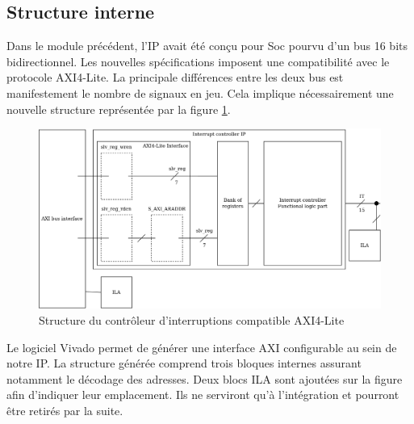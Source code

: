 \subsection{Structure interne}
Dans le module précédent, l'IP avait été conçu pour Soc pourvu d'un bus 16 bits bidirectionnel.
Les nouvelles spécifications imposent une compatibilité avec le protocole AXI4-Lite.
La principale différences entre les deux bus est manifestement le nombre de signaux en jeu.
Cela implique nécessairement une nouvelle structure représentée par la figure \ref{fig:modif_IP}.
\begin{figure}[H]
	\centering
	\includegraphics[width=0.8\linewidth]{figure/inside_IT_controller.png}
	\caption{Structure du contrôleur d'interruptions compatible AXI4-Lite}
	\label{fig:modif_IP}
\end{figure}
Le logiciel Vivado permet de générer une interface AXI configurable au sein de notre IP.
La structure générée comprend trois bloques internes assurant notamment le décodage des adresses.
Deux blocs ILA sont ajoutées sur la figure afin d'indiquer leur emplacement.
Ils ne serviront qu'à l'intégration et pourront être retirés par la suite.
